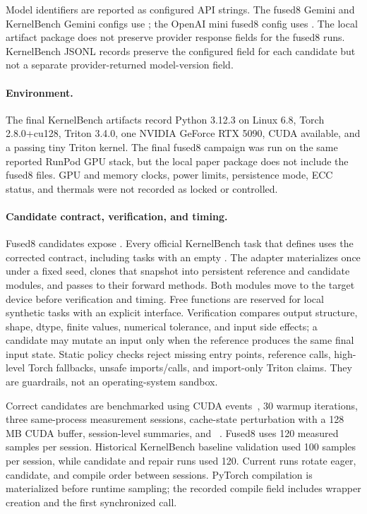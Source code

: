 Model identifiers are reported as configured API strings. The fused8 Gemini and KernelBench Gemini configs use ; the OpenAI mini fused8 config uses . The local artifact package does not preserve provider response  fields for the fused8 runs. KernelBench JSONL records preserve the configured  field for each candidate but not a separate provider-returned model-version field.

\paragraph{Environment.}
The final KernelBench artifacts record Python 3.12.3 on Linux 6.8, Torch 2.8.0+cu128, Triton 3.4.0, one NVIDIA GeForce RTX 5090, CUDA available, and a passing tiny Triton kernel. The final fused8 campaign was run on the same reported RunPod GPU stack, but the local paper package does not include the fused8  files. GPU and memory clocks, power limits, persistence mode, ECC status, and thermals were not recorded as locked or controlled.

\paragraph{Candidate contract, verification, and timing.}
Fused8 candidates expose . Every official KernelBench task that defines  uses the corrected  contract, including tasks with an empty . The adapter materializes  once under a fixed seed, clones that snapshot into persistent reference and candidate modules, and passes  to their forward methods. Both modules move to the target device before verification and timing. Free functions are reserved for local synthetic tasks with an explicit  interface. Verification compares output structure, shape, dtype, finite values, numerical tolerance, and input side effects; a candidate may mutate an input only when the reference produces the same final input state. Static policy checks reject missing entry points, reference calls, high-level Torch fallbacks, unsafe imports/calls, and import-only Triton claims. They are guardrails, not an operating-system sandbox.

Correct candidates are benchmarked using CUDA events~\cite{nvidiaCudaEvents}, 30 warmup iterations, three same-process measurement sessions, cache-state perturbation with a 128 MB CUDA buffer, session-level summaries, and \compile{}~\cite{ansel2024pytorch2}. Fused8 uses 120 measured samples per session. Historical KernelBench baseline validation used 100 samples per session, while candidate and repair runs used 120. Current runs rotate eager, candidate, and compile order between sessions. PyTorch compilation is materialized before runtime sampling; the recorded compile field includes wrapper creation and the first synchronized call.

